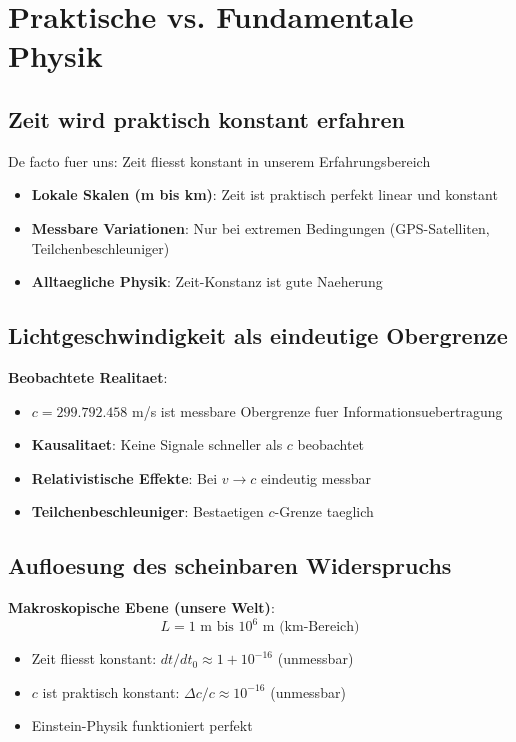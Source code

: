 	\section{Praktische vs. Fundamentale Physik}
	
	\subsection{Zeit wird praktisch konstant erfahren}
	
	De facto fuer uns: Zeit fliesst konstant in unserem Erfahrungsbereich
	\begin{itemize}
		\item \textbf{Lokale Skalen (m bis km)}: Zeit ist praktisch perfekt linear und konstant
		\item \textbf{Messbare Variationen}: Nur bei extremen Bedingungen (GPS-Satelliten, Teilchenbeschleuniger)
		\item \textbf{Alltaegliche Physik}: Zeit-Konstanz ist gute Naeherung
	\end{itemize}
	
	\subsection{Lichtgeschwindigkeit als eindeutige Obergrenze}
	
	\textbf{Beobachtete Realitaet}:
	\begin{itemize}
		\item $c = 299.792.458$ m/s ist messbare Obergrenze fuer Informationsuebertragung
		\item \textbf{Kausalitaet}: Keine Signale schneller als $c$ beobachtet
		\item \textbf{Relativistische Effekte}: Bei $v \rightarrow c$ eindeutig messbar
		\item \textbf{Teilchenbeschleuniger}: Bestaetigen $c$-Grenze taeglich
	\end{itemize}
	
	\subsection{Aufloesung des scheinbaren Widerspruchs}
	
	\textbf{Makroskopische Ebene (unsere Welt)}:
	\begin{equation}
		L = 1 \text{ m bis } 10^6 \text{ m (km-Bereich)}
	\end{equation}
	
	\begin{itemize}
		\item Zeit fliesst konstant: $dt/dt_0 \approx 1 + 10^{-16}$ (unmessbar)
		\item $c$ ist praktisch konstant: $\Delta c/c \approx 10^{-16}$ (unmessbar)
		\item Einstein-Physik funktioniert perfekt
	\end{itemize}
	
